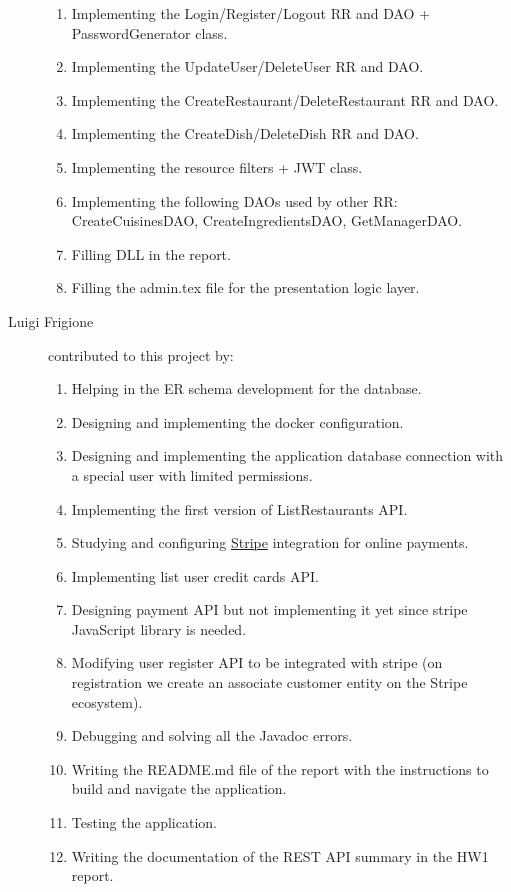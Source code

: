 \begin{description}
\begin{enumerate}
                \item Implementing the Login/Register/Logout RR and DAO + PasswordGenerator class.
                \item Implementing the UpdateUser/DeleteUser RR and DAO.
                \item Implementing the CreateRestaurant/DeleteRestaurant RR and DAO.
                \item Implementing the CreateDish/DeleteDish RR and DAO.
                \item Implementing the resource filters + JWT class.
                \item Implementing the following DAOs used by other RR: CreateCuisinesDAO, CreateIngredientsDAO, GetManagerDAO.
                \item Filling DLL in the report.
                \item Filling the admin.tex file for the presentation logic layer.
            \end{enumerate}
	\item[Luigi Frigione] contributed to this project by:
		\begin{enumerate}
			\item Helping in the ER schema development for the database.
			\item Designing and implementing the docker configuration.
			\item Designing and implementing the application database connection with a special user with limited permissions.
			\item Implementing the first version of ListRestaurants API.
			\item Studying and configuring \underline{\href{https://stripe.com/en-it}{Stripe}} integration for online payments.
			\item Implementing list user credit cards API.
			\item Designing payment API but not implementing it yet since stripe JavaScript library is needed.
			\item Modifying user register API to be integrated with stripe (on registration we create an associate customer entity on the Stripe ecosystem).
			\item Debugging and solving all the Javadoc errors.
			\item Writing the README.md file of the report with the instructions to build and navigate the application.
			\item Testing the application.
			\item Writing the documentation of the REST API summary in the HW1 report.

\end{enumerate}
\end{description}
